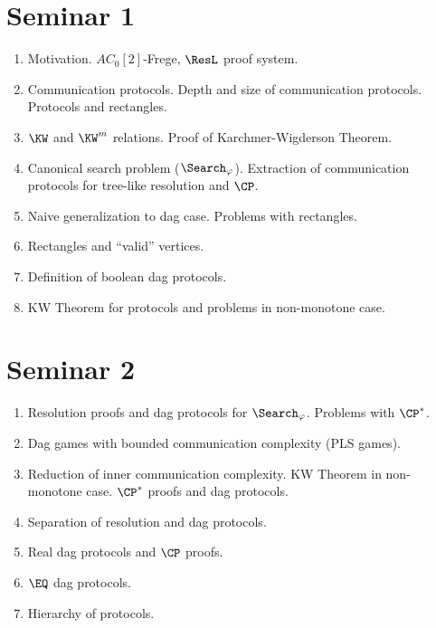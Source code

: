 \section{Seminar 1}

\begin{enumerate}
    \item Motivation. $AC_0[2]$-Frege, $\ResL$ proof system.
    \item Communication protocols. Depth and size of communication protocols. Protocols and rectangles.
    \item $\KW$ and $\KW^m$ relations. Proof of Karchmer-Wigderson Theorem.
    \item Canonical search problem ($\Search_{\varphi}$). Extraction of communication protocols for
        tree-like resolution and $\CP$.
    \item Naive generalization to dag case. Problems with rectangles.
    \item Rectangles and ``valid'' vertices.
    \item Definition of boolean dag protocols. %
    \item KW Theorem for protocols and problems in non-monotone case. %
\end{enumerate}


\section{Seminar 2}

\begin{enumerate}
    \item Resolution proofs and dag protocols for $\Search_{\varphi}$. Problems with $\CP^*$.
    \item Dag games with bounded communication complexity (PLS games).
    \item Reduction of inner communication complexity. KW Theorem in non-monotone case. $\CP^*$ proofs
        and dag protocols. %
    \item Separation of resolution and dag protocols.
    \item Real dag protocols and $\CP$ proofs. %
    \item $\EQ$ dag protocols.
    \item Hierarchy of protocols.
\end{enumerate}